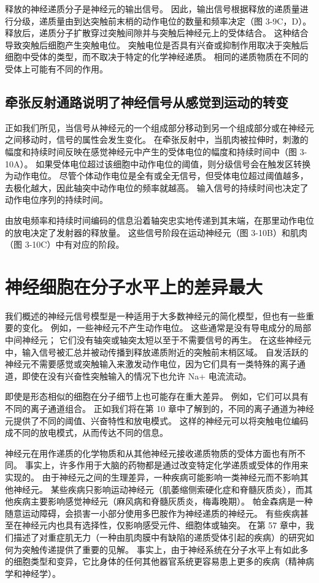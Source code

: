 释放的神经递质分子是神经元的输出信号。 
因此，输出信号根据释放的递质量进行分级，递质量由到达突触前末梢的动作电位的数量和频率决定（图 3-9C，D）。 
释放后，递质分子扩散穿过突触间隙并与突触后神经元上的受体结合。 
这种结合导致突触后细胞产生突触电位。 
突触电位是否具有兴奋或抑制作用取决于突触后细胞中受体的类型，而不取决于特定的化学神经递质。 
相同的递质物质在不同的受体上可能有不同的作用。


\subsection{牵张反射通路说明了神经信号从感觉到运动的转变}
正如我们所见，当信号从神经元的一个组成部分移动到另一个组成部分或在神经元之间移动时，信号的属性会发生变化。 
在牵张反射中，当肌肉被拉伸时，刺激的幅度和持续时间反映在感觉神经元中产生的受体电位的幅度和持续时间中（图 3-10A）。 
如果受体电位超过该细胞中动作电位的阈值，则分级信号会在触发区转换为动作电位。 
尽管个体动作电位是全有或全无信号，但受体电位超过阈值越多，去极化越大，因此轴突中动作电位的频率就越高。 
输入信号的持续时间也决定了动作电位序列的持续时间。


由放电频率和持续时间编码的信息沿着轴突忠实地传递到其末端，在那里动作电位的放电决定了发射器的释放量。 
这些信号阶段在运动神经元（图 3-10B）和肌肉（图 3-10C）中有对应的阶段。


\section{神经细胞在分子水平上的差异最大}
我们概述的神经元信号模型是一种适用于大多数神经元的简化模型，但也有一些重要的变化。 
例如，一些神经元不产生动作电位。 
这些通常是没有导电成分的局部中间神经元； 它们没有轴突或轴突太短以至于不需要信号的再生。 
在这些神经元中，输入信号被汇总并被动传播到释放递质附近的突触前末梢区域。 
自发活跃的神经元不需要感觉或突触输入来激发动作电位，因为它们具有一类特殊的离子通道，即使在没有兴奋性突触输入的情况下也允许 Na+ 电流流动。


即使是形态相似的细胞在分子细节上也可能存在重大差异。 
例如，它们可以具有不同的离子通道组合。 
正如我们将在第 10 章中了解到的，不同的离子通道为神经元提供了不同的阈值、兴奋特性和放电模式。 
这样的神经元可以将突触电位编码成不同的放电模式，从而传达不同的信息。


神经元在用作递质的化学物质和从其他神经元接收递质物质的受体方面也有所不同。 
事实上，许多作用于大脑的药物都是通过改变特定化学递质或受体的作用来实现的。 
由于神经元之间的生理差异，一种疾病可能影响一类神经元而不影响其他神经元。 
某些疾病只影响运动神经元（肌萎缩侧索硬化症和脊髓灰质炎），而其他疾病主要影响感觉神经元（麻风病和脊髓灰质炎，梅毒晚期）。 
帕金森病是一种随意运动障碍，会损害一小部分使用多巴胺作为神经递质的神经元。 
有些疾病甚至在神经元内也具有选择性，仅影响感受元件、细胞体或轴突。 
在第 57 章中，我们描述了对重症肌无力（一种由肌肉膜中有缺陷的递质受体引起的疾病）的研究如何为突触传递提供了重要的见解。 
事实上，由于神经系统在分子水平上有如此多的细胞类型和变异，它比身体的任何其他器官系统更容易患上更多的疾病（精神病学和神经学）。



